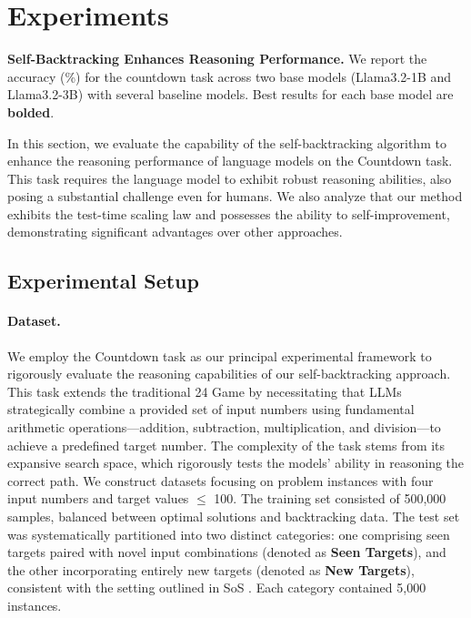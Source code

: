 \documentclass{article}
\theoremstyle{plain}
\theoremstyle{definition}
\theoremstyle{remark}
\begin{document}
\section{Experiments}
\label{exp}
\begin{table}[t]
\centering
\caption{\textbf{Self-Backtracking Enhances Reasoning Performance.} We report the accuracy (\%) for the countdown task across two base models (Llama3.2-1B and Llama3.2-3B) with several baseline models. Best results for each base model are \textbf{bolded}.}
\label{maintab}

\vspace{-10pt}
\end{table}
In this section, we evaluate the capability of the self-backtracking algorithm to enhance the reasoning performance of language models on the Countdown \cite{sos,gsos} task. This task requires the language model to exhibit robust reasoning abilities, also posing a substantial challenge even for humans. We also analyze that our method exhibits the test-time scaling law and possesses the ability to self-improvement, demonstrating significant advantages over other approaches.
\subsection{Experimental Setup}
\paragraph{Dataset.} We employ the Countdown task \cite{sos} as our principal experimental framework to rigorously evaluate the reasoning capabilities of our self-backtracking approach. This task extends the traditional 24 Game \cite{yang2022chain} by necessitating that LLMs strategically combine a provided set of input numbers using fundamental arithmetic operations—addition, subtraction, multiplication, and division—to achieve a predefined target number. The complexity of the task stems from its expansive search space, which rigorously tests the models' ability in reasoning the correct path. We construct datasets focusing on problem instances with four input numbers and target values $\leq$ 100. The training set consisted of 500,000 samples, balanced between optimal solutions and backtracking data. The test set was systematically partitioned into two distinct categories: one comprising seen targets paired with novel input combinations (denoted as \textbf{Seen Targets}), and the other incorporating entirely new targets (denoted as \textbf{New Targets}), consistent with the setting outlined in SoS \cite{sos}. Each category contained 5,000 instances. 
\end{document}
